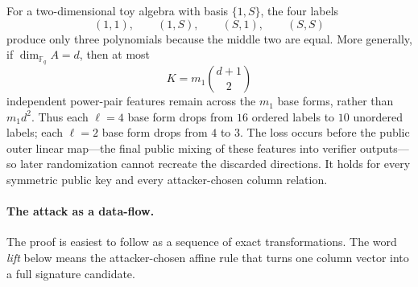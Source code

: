 \documentclass[11pt]{article}
\newcommand{\F}{\mathbb F}
\begin{document}
For a two-dimensional toy algebra with basis $\{1,S\}$, the four labels
\[
 (1,1),\qquad(1,S),\qquad(S,1),\qquad(S,S)
\]
produce only three polynomials because the middle two are equal.  More
generally, if $\dim_{\F_q}A=d$, then at most
\begin{equation}\label{eq:intro-K}
  K=m_1\binom{d+1}{2}
\end{equation}
independent power-pair features remain across the $m_1$ base forms, rather
than $m_1d^2$.  Thus each $\ell=4$ base form drops from $16$ ordered labels to
$10$ unordered labels; each $\ell=2$ base form drops from $4$ to $3$.  The
loss occurs before the public outer linear map---the final public mixing of
these features into verifier outputs---so later randomization cannot recreate
the discarded directions.  It holds for every symmetric public key
and every attacker-chosen column relation.

\begin{center}
\end{center}

\paragraph{The attack as a data-flow.}
The proof is easiest to follow as a sequence of exact transformations.  The
word \emph{lift} below means the attacker-chosen affine rule that turns one
column vector into a full signature candidate.
\end{document}
